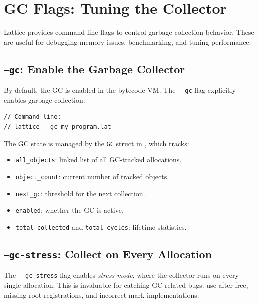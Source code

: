 \section{GC Flags: Tuning the Collector}\label{sec:gc-flags}


Lattice provides command-line flags to control garbage collection behavior.
These are useful for debugging memory issues, benchmarking, and tuning performance.

\subsection{\texttt{--gc}: Enable the Garbage Collector}\label{subsec:gc-flag}


By default, the GC is enabled in the bytecode VM.
The \lstinline|--gc| flag explicitly enables garbage collection:

\begin{lstlisting}[language=Lattice, caption={Running with GC enabled}]
// Command line:
// lattice --gc my_program.lat
\end{lstlisting}

The GC state is managed by the \lstinline|GC| struct in , which tracks:
\begin{itemize}
  \item \lstinline|all_objects|: linked list of all GC-tracked allocations.
  \item \lstinline|object_count|: current number of tracked objects.
  \item \lstinline|next_gc|: threshold for the next collection.
  \item \lstinline|enabled|: whether the GC is active.
  \item \lstinline|total_collected| and \lstinline|total_cycles|: lifetime statistics.
\end{itemize}

\subsection{\texttt{--gc-stress}: Collect on Every Allocation}\label{subsec:gc-stress}


The \lstinline|--gc-stress| flag enables \emph{stress mode}, where the collector runs on every single allocation.
This is invaluable for catching GC-related bugs: use-after-free, missing root registrations, and incorrect mark implementations.

